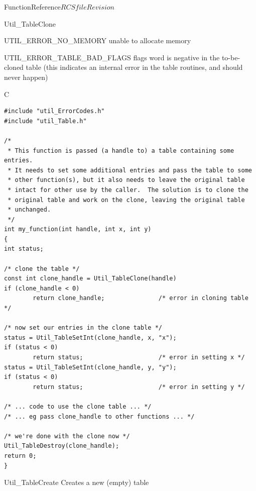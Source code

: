 \begin{cactuspart}{FunctionReference}{$RCSfile$}{$Revision$}
\begin{FunctionDescription}{Util\_TableClone}
\begin{ErrorSection}
\begin{Error}{UTIL\_ERROR\_NO\_MEMORY}
unable to allocate memory
\end{Error}
\begin{Error}{UTIL\_ERROR\_TABLE\_BAD\_FLAGS}
flags word is negative in the to-be-cloned table
(this indicates an internal error in the table routines,
and should never happen)
\end{Error}
\end{ErrorSection}

\begin{ExampleSection}
\begin{Example}{C}
\begin{verbatim}
#include "util_ErrorCodes.h"
#include "util_Table.h"

/*
 * This function is passed (a handle to) a table containing some entries.
 * It needs to set some additional entries and pass the table to some
 * other function(s), but it also needs to leave the original table
 * intact for other use by the caller.  The solution is to clone the
 * original table and work on the clone, leaving the original table
 * unchanged.
 */
int my_function(int handle, int x, int y)
{
int status;

/* clone the table */
const int clone_handle = Util_TableClone(handle)
if (clone_handle < 0)
        return clone_handle;               /* error in cloning table */

/* now set our entries in the clone table */
status = Util_TableSetInt(clone_handle, x, "x");
if (status < 0)
        return status;                     /* error in setting x */
status = Util_TableSetInt(clone_handle, y, "y");
if (status < 0)
        return status;                     /* error in setting y */

/* ... code to use the clone table ... */
/* ... eg pass clone_handle to other functions ... */

/* we're done with the clone now */
Util_TableDestroy(clone_handle);
return 0;
}
\end{verbatim}
\end{Example}
\end{ExampleSection}
\end{FunctionDescription}


\begin{FunctionDescription}{Util\_TableCreate}
\label{Util-TableCreate}
Creates a new (empty) table


\end{FunctionDescription}
\end{cactuspart}
